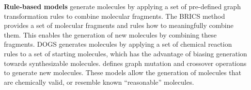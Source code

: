 \textbf{Rule-based models} generate molecules by applying a set of pre-defined graph transformation rules to
combine molecular fragments. The BRICS \citep{degenArtCompilingUsing2008} method provides a set of
molecular fragments and rules how to meaningfully combine them. This enables the generation of new
molecules by combining these fragments. DOGS \citep{hartenfellerDOGSReactionDrivenNovo2012}
generates molecules by applying a set of chemical reaction rules to a set of starting molecules,
which has the advantage of biasing generation towards synthesizable molecules.\@
\citet{jensenGraphbasedGeneticAlgorithm2019} defines graph mutation and crossover operations to
generate new molecules. These models allow the generation of molecules that are chemically valid, or
resemble known ``reasonable'' molecules.


